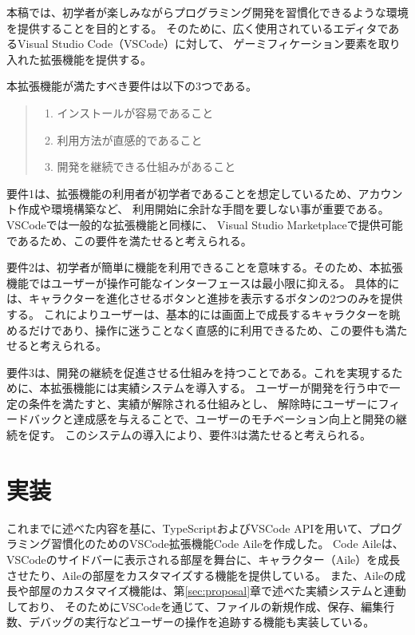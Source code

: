 \documentclass[12pt,twoside]{jbook}
\begin{document}
 本稿では、初学者が楽しみながらプログラミング開発を習慣化できるような環境を提供することを目的とする。
そのために、広く使用されているエディタであるVisual Studio Code（VSCode）に対して、
ゲーミフィケーション要素を取り入れた拡張機能を提供する。

 本拡張機能が満たすべき要件は以下の3つである。
\begin{quote}
	\begin{enumerate}
	 \item インストールが容易であること
	 \item 利用方法が直感的であること
	 \item 開発を継続できる仕組みがあること
	\end{enumerate}
\end{quote}

 要件1は、拡張機能の利用者が初学者であることを想定しているため、アカウント作成や環境構築など、
利用開始に余計な手間を要しない事が重要である。VSCodeでは一般的な拡張機能と同様に、
Visual Studio Marketplaceで提供可能であるため、この要件を満たせると考えられる。

 要件2は、初学者が簡単に機能を利用できることを意味する。そのため、本拡張機能ではユーザーが操作可能なインターフェースは最小限に抑える。
具体的には、キャラクターを進化させるボタンと進捗を表示するボタンの2つのみを提供する。
これによりユーザーは、基本的には画面上で成長するキャラクターを眺めるだけであり、操作に迷うことなく直感的に利用できるため、この要件も満たせると考えられる。

 要件3は、開発の継続を促進させる仕組みを持つことである。これを実現するために、本拡張機能には実績システムを導入する。
ユーザーが開発を行う中で一定の条件を満たすと、実績が解除される仕組みとし、
解除時にユーザーにフィードバックと達成感を与えることで、ユーザーのモチベーション向上と開発の継続を促す。
このシステムの導入により、要件3は満たせると考えられる。


\chapter{実装}
 これまでに述べた内容を基に、TypeScriptおよびVSCode APIを用いて、プログラミング習慣化のためのVSCode拡張機能Code Aileを作成した。
Code Aileは、VSCodeのサイドバーに表示される部屋を舞台に、キャラクター（Aile）を成長させたり、Aileの部屋をカスタマイズする機能を提供している。
また、Aileの成長や部屋のカスタマイズ機能は、第\ref{sec:proposal}章で述べた実績システムと連動しており、
そのためにVSCodeを通じて、ファイルの新規作成、保存、編集行数、デバッグの実行などユーザーの操作を追跡する機能も実装している。
\end{document}
